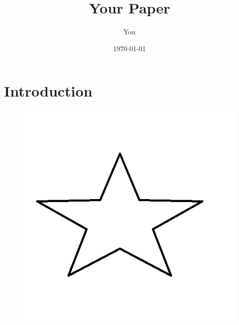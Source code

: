\documentclass[a4paper]{article}
\title{Your Paper}
\author{You}
\date{\today}
\begin{document}
\maketitle

\section{Introduction}

\begin{figure}
\includegraphics[scale=1]{Untitled}
\end{figure}
\end{document}
